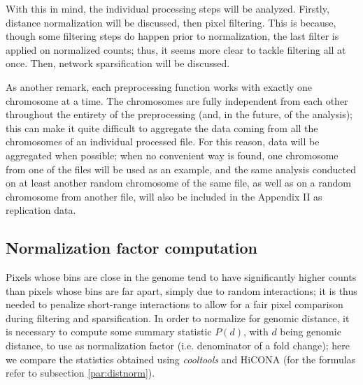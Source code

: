With this in mind, the individual processing steps will be analyzed. Firstly, distance normalization will be discussed, then pixel filtering. This is because, though some filtering steps do happen prior to normalization, the last filter is applied on normalized counts; thus, it seems more clear to tackle filtering all at once. Then, network sparsification will be discussed. 

As another remark, each preprocessing function works with exactly one chromosome at a time. The chromosomes are fully independent from each other throughout the entirety of the preprocessing (and, in the future, of the analysis); this can make it quite difficult to aggregate the data coming from all the chromosomes of an individual processed file. For this reason, data will be aggregated when possible; when no convenient way is found, one chromosome from one of the files will be used as an example, and the same analysis conducted on at least another random chromosome of the same file, as well as on a random chromosome from another file, will also be included in the Appendix II as replication data.

\subsection{Normalization factor computation}

Pixels whose bins are close in the genome tend to have significantly higher counts than pixels whose bins are far apart, simply due to random interactions; it is thus needed to penalize short-range interactions to allow for a fair pixel comparison during filtering and sparsification. In order to normalize for genomic distance, it is necessary to compute some summary statistic $P(d)$, with $d$ being genomic distance, to use as normalization factor (i.e. denominator of a fold change); here we compare the statistics obtained using \textit{cooltools} and HiCONA (for the formulas refer to subsection \ref{par:distnorm}). 

